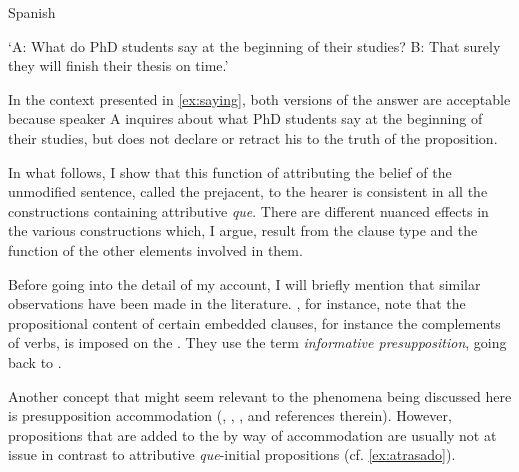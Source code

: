\ea\label{ex:saying}Spanish 
\begin{xlist}
\end{xlist}
\glt `A: What do PhD students say at the beginning of their studies? B: That surely they will finish their thesis on time.'
\z

In the context presented in \eqref{ex:saying}, both versions of the answer are acceptable because speaker A inquires about what PhD students say at the beginning of their studies, but does not declare or retract his  to the truth of the proposition. 

In what follows, I show that this function of attributing the belief of the unmodified sentence, called the prejacent, to the hearer is consistent in all the constructions containing attributive \emph{que}. There  are different nuanced effects in the various constructions which, I argue, result from the clause type and the function of the other elements involved in them.  

Before going into the detail of my account, I will briefly mention that  similar observations have been made in the literature.  \citet{Bianchi2017}, for instance, note that the propositional content of certain embedded clauses, for instance the complements of  verbs, is imposed on the . They use  the term  \emph{informative presupposition}, going back to \citet{Prince1978}.   

Another concept that might seem relevant to the phenomena being discussed here is  presupposition accommodation (\citealt{Beaver2001},
\citealt{Simons2003}, \citealt{Beaver2007},  \citealt{Fintel2008} and references therein). However, propositions that are added to the  by way of accommodation are usually not at issue in contrast to attributive  \emph{que}-initial propositions (cf. \ref{ex:atrasado}).  

